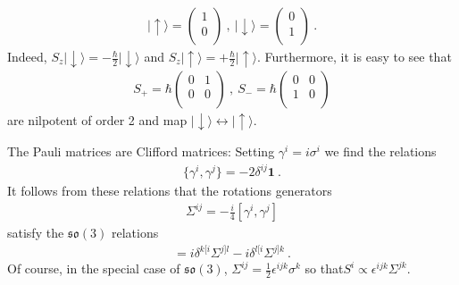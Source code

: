 \documentclass[12pt]{article}
\def\ket#1{\left| #1\rangle\right.}
\begin{document}
\begin{eqnarray}
\ket{\uparrow}=\left(\begin{matrix}1\\0\\ \end{matrix}\right)~,~
\ket{\downarrow}=\left(\begin{matrix}0\\1\\ \end{matrix}\right)~.
\end{eqnarray}
Indeed, $S_z \ket \downarrow =-\frac \hbar2 \ket \downarrow$ and $S_z \ket \uparrow =+\frac \hbar2 \ket \uparrow$. Furthermore, it is easy to see that 
\begin{eqnarray}
S_+ = \hbar \left(\begin{matrix} 0&1\\0&0\\ \end{matrix}\right)~,~
S_- = \hbar \left(\begin{matrix} 0&0\\1&0\\ \end{matrix}\right)
\end{eqnarray}
are nilpotent of order 2 and map $\ket \downarrow \leftrightarrow \ket \uparrow$.

The Pauli matrices are Clifford matrices: Setting $\gamma^i=i\sigma^i$ we find the relations
\begin{eqnarray}
\{ \gamma^i, \gamma^j\}=-2\delta^{ij} \mathbf 1~.
\end{eqnarray}
It follows from these relations that the rotations generators 
\begin{eqnarray}
\label{generator}
\Sigma^{ij}=-\frac i4 [ \gamma^i, \gamma^j]
\end{eqnarray}
satisfy the $\mathfrak {so}(3)$ relations
\begin{eqnarray}
[\Sigma^{ij}, \Sigma^{kl}]=i \delta^{k[i}\Sigma^{j]l}-i \delta^{l[i}\Sigma^{j]k}~.
\end{eqnarray}
Of course, in the special case of $\mathfrak {so}(3)$, $\Sigma^{ij}=\frac12 \epsilon^{ijk} \sigma^k$ so that$S^i\propto \epsilon^{ijk}\Sigma^{jk}$. 
\end{document}
